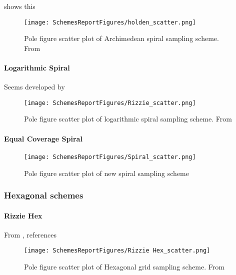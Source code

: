\documentclass{article}
\begin{document}
\cite{klug_x-ray_1974} shows this

\begin{figure}[ht]
    \centering
    \texttt{[image: SchemesReportFigures/holden\_scatter.png]}
    \caption{Pole figure scatter plot of Archimedean spiral sampling scheme. From \cite{Holden}}
\end{figure}

\paragraph{Logarithmic Spiral}

Seems developed by \citep{rizzie_elaboration_2008} 

\begin{figure}[ht]
    \centering
    \texttt{[image: SchemesReportFigures/Rizzie\_scatter.png]}
    \caption{Pole figure scatter plot of logarithmic spiral sampling scheme. From \cite{rizzie_elaboration_2008} }
\end{figure}



\paragraph{Equal Coverage Spiral}



\begin{figure}[ht]
    \centering
    \texttt{[image: SchemesReportFigures/Spiral\_scatter.png]}
    \caption{Pole figure scatter plot of new spiral sampling scheme}
\end{figure}


\subsubsection{Hexagonal schemes}

\paragraph{Rizzie Hex}
From \citep{rizzie_elaboration_2008}, references \cite{matthies_optimization_1992}

\begin{figure}[ht]
    \centering
    \texttt{[image: SchemesReportFigures/Rizzie Hex\_scatter.png]}
    \caption{Pole figure scatter plot of Hexagonal grid sampling scheme. From \cite{rizzie_elaboration_2008}}
\end{figure}
\end{document}
